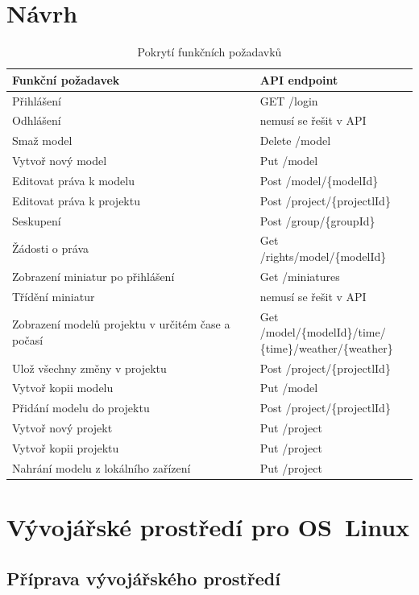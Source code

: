 \documentclass[thesis=B,czech]{FITthesis}[2012/06/26]
\begin{document}
\chapter{Návrh}

    \begin{table}\centering
    	\caption{Pokrytí funkčních požadavků}
    	\begin{tabular}{| p{6cm} | p{5cm} |}\hline
    		Funkční požadavek		& API endpoint	\tabularnewline \hline \hline
            Přihlášení & GET /login
    		\tabularnewline \hline
    		Odhlášení & nemusí se řešit v API
        	\tabularnewline \hline
            Smaž model &	Delete /model
        	\tabularnewline \hline
            Vytvoř nový model &	Put /model
        	\tabularnewline \hline
            Editovat práva k modelu &	Post /model/\{modelId\}
        	\tabularnewline \hline
            Editovat práva k projektu &	Post /project/\{projectlId\}
        	\tabularnewline \hline
            Seskupení	&Post /group/\{groupId\}
        	\tabularnewline \hline
            Žádosti o práva &	Get /rights/model/\{modelId\}
        	\tabularnewline \hline
            Zobrazení miniatur po přihlášení &	Get /miniatures
        	\tabularnewline \hline
            Třídění miniatur &	nemusí se řešit v API
        	\tabularnewline \hline
            Zobrazení modelů projektu v určitém čase a počasí &
            \parbox[t]{5cm}{Get /model/\{modelId\}/time/\\\{time\}/weather/\{weather\}}
        	\tabularnewline \hline
            Ulož všechny změny v projektu &	Post /project/\{projectlId\}
        	\tabularnewline \hline
            Vytvoř kopii modelu	& Put /model
        	\tabularnewline \hline
            Přidání modelu do projektu &	Post /project/\{projectlId\}
        	\tabularnewline \hline
            Vytvoř nový projekt &	Put /project
        	\tabularnewline \hline
            Vytvoř kopii projektu &	Put /project
        	\tabularnewline \hline
            Nahrání modelu z lokálního zařízení &	Put /project
        	\tabularnewline \hline
        \end{tabular}
    \end{table}

\chapter{Vývojářské prostředí pro OS~Linux}
    \section{Příprava vývojářského prostředí}
\end{document}
